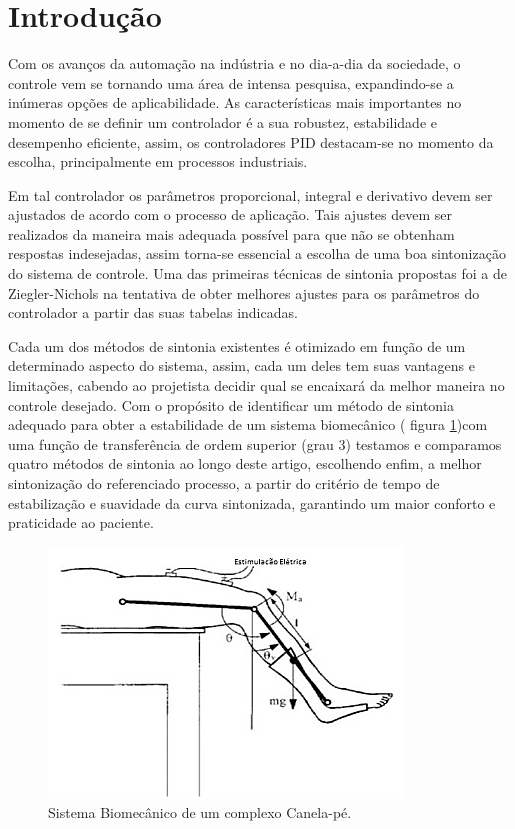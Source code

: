 \documentclass[article,12pt,oneside,a4paper,english,brazil,sumario=tradicional]{abntex2}
\begin{document}
\textual
\pagestyle{simple}


\section{\large Introdu\c c\~ao}
\label{secIntroducao}
\normalsize
\SingleSpacing
Com os avanços da automação na indústria e no dia-a-dia da sociedade, o controle vem se tornando uma área de intensa pesquisa, expandindo-se a inúmeras opções de aplicabilidade.
As características mais importantes no momento de se definir um controlador é a sua robustez, estabilidade e desempenho eficiente, assim, os controladores PID destacam-se no momento da escolha, principalmente em processos industriais.  

Em tal controlador os parâmetros proporcional, integral e derivativo devem ser ajustados de acordo com o processo de aplicação. Tais ajustes devem ser realizados da maneira mais adequada possível para que não se obtenham respostas indesejadas, assim torna-se essencial a escolha de uma boa sintonização do sistema de controle. Uma das primeiras técnicas de sintonia propostas foi a de Ziegler-Nichols \cite{zn} na
tentativa de obter melhores ajustes para os parâmetros do controlador a partir das suas tabelas indicadas. 

Cada um dos métodos de sintonia existentes é otimizado em função de um determinado aspecto do sistema, assim, cada um deles tem suas vantagens e limitações, cabendo ao projetista decidir qual se encaixará da melhor maneira no controle desejado. Com o propósito de identificar um método de sintonia adequado para obter a estabilidade de um sistema biomecânico ( figura \ref{canela})com uma função de transferência de ordem superior (grau 3) testamos e comparamos quatro métodos de sintonia ao longo deste artigo, escolhendo enfim, a melhor sintonização do referenciado processo, a partir do critério de tempo de estabilização e suavidade da curva sintonizada, garantindo um maior conforto e praticidade ao paciente.
\begin{figure}[H]
    \centering
    \includegraphics[scale=0.5]{canneal.png}
    \caption{Sistema Biomecânico de um complexo Canela-pé. }
    \label{canela}
\end{figure}
\end{document}
